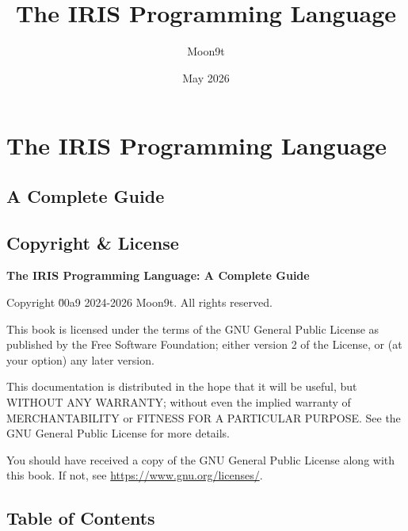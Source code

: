 \documentclass[
  english,
]{book}
\title{The IRIS Programming Language}
\author{Moon9t}
\date{May 2026}
\begin{document}
\frontmatter
\maketitle

{
\setcounter{tocdepth}{2}
\tableofcontents
}
\mainmatter
\chapter{The IRIS Programming
Language}\label{the-iris-programming-language}

\section{A Complete Guide}\label{a-complete-guide}

\newpage

\section{Copyright \& License}\label{copyright-license}

\textbf{The IRIS Programming Language: A Complete Guide}

Copyright \u00a9 2024-2026 Moon9t. All rights reserved.

This book is licensed under the terms of the GNU General Public License
as published by the Free Software Foundation; either version 2 of the
License, or (at your option) any later version.

This documentation is distributed in the hope that it will be useful,
but WITHOUT ANY WARRANTY; without even the implied warranty of
MERCHANTABILITY or FITNESS FOR A PARTICULAR PURPOSE. See the GNU General
Public License for more details.

You should have received a copy of the GNU General Public License along
with this book. If not, see \url{https://www.gnu.org/licenses/}.

\newpage

\section{Table of Contents}\label{table-of-contents}
\end{document}
